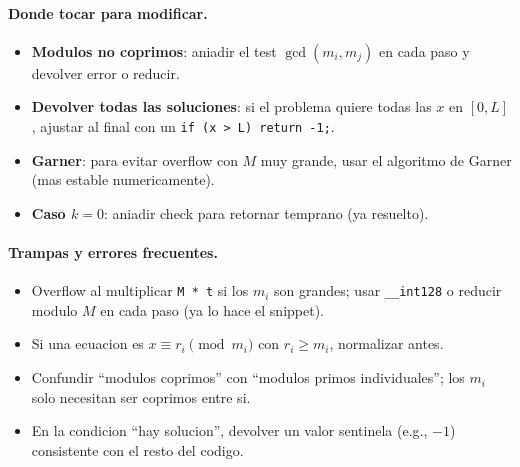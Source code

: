 \paragraph{Donde tocar para modificar.}
\begin{itemize}\setlength\itemsep{0pt}
	\item \textbf{Modulos no coprimos}: aniadir el test $\gcd(m_i, m_j)$ en cada paso y devolver error o reducir.
	\item \textbf{Devolver todas las soluciones}: si el problema quiere todas las $x$ en $[0, L]$, ajustar al final con un \texttt{if (x > L) return -1;}.
	\item \textbf{Garner}: para evitar overflow con $M$ muy grande, usar el algoritmo de Garner (mas estable numericamente).
	\item \textbf{Caso $k = 0$}: aniadir check para retornar temprano (ya resuelto).
\end{itemize}

\paragraph{Trampas y errores frecuentes.}
\begin{itemize}\setlength\itemsep{0pt}
	\item Overflow al multiplicar \texttt{M * t} si los $m_i$ son grandes; usar \texttt{\_\_int128} o reducir modulo $M$ en cada paso (ya lo hace el snippet).
	\item Si una ecuacion es $x \equiv r_i \pmod{m_i}$ con $r_i \ge m_i$, normalizar antes.
	\item Confundir ``modulos coprimos'' con ``modulos primos individuales''; los $m_i$ solo necesitan ser coprimos entre si.
	\item En la condicion ``hay solucion'', devolver un valor sentinela (e.g., $-1$) consistente con el resto del codigo.
\end{itemize}

